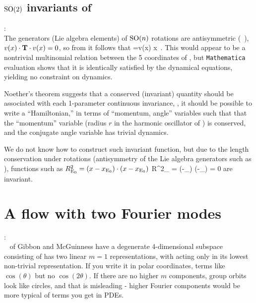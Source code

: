 \subsection{$\textrm{SO}(2)$ invariants of \cLe}
\label{sect:invariants}

:\\
The generators (Lie algebra elements) of $\textrm{SO}(n)$ rotations
are antisymmetric (\cf\ ),
$v(x)\cdot \mathbf{T} \cdot v(x)=0$, so from 
it follows that
=v(x) \cdot {} \cdot \Lg \cdot x
\,.
\label{eq:ObscurIdnt}
\eeq
This would appear to be a nontrivial multinomial relation between
the 5 coordinates of \cLe, but \texttt{Mathematica}
evaluation shows that it is identically satisfied by the
dynamical equations, yielding no constraint on dynamics.

Noether's theorem suggests that a conserved (invariant)
quantity should be associated with each 1-parameter
continuous invariance, \ie, it should be
possible to write a ``Hamiltonian,'' in terms of ``momentum,
angle'' variables such that that the ``momentum'' variable
(radius $r$ in the harmonic oscillator of
) is conserved, and the conjugate
angle variable has trivial dynamics.

We do not know how to construct such invariant function,
but due to the length conservation under rotations
(antisymmetry of the Lie algebra generators such as ),
functions such as
$R^2_{\mathrm{E}_{0}} = (x-x_{\mathrm{E}_{0}}) \cdot (x-x_{\mathrm{E}_{0}}) $
\beq
{} R^2_{} = (\ssp-\ssp_{}) \cdot \Lg \cdot (\ssp-\ssp_{})
= 0
are invariant.

\section{A flow with two Fourier modes}

:\\
\CLe\  of Gibbon and McGuinness have a
degenerate 4-dimensional subspace consisting of has two linear $m=1$
representations, with  acting only in its lowest non-trivial
representation. If you write it in polar coordinates, terms like
$\cos(\theta)$ but no $\cos(2\theta)$. If there are no higher $m$
components, group orbits look like circles, and that is misleading -
higher Fourier components would be more typical of terms you get in PDEs.


